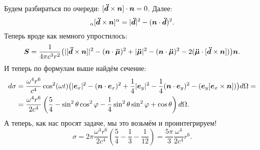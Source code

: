 Будем разбираться по очереди: $[\mbox{\boldmath $\ddot{d}$} \times \mbox{\boldmath $n$}] \cdot \mbox{\boldmath $n$} = 0$.
Далее:
\begin{equation*}
    [\vc{\ddot{d}} \times \vc{n}]_\alpha [\vc{\ddot{d}} \times \vc{n}]^\alpha = |\vc{\ddot{d}}|^2 - (\vc{n} \cdot \vc{\ddot{d}})^2.
\end{equation*}
Теперь вроде как немного упростилось:
\begin{equation*}
    \mbox{\boldmath $S$} = \frac{1}{4 \pi c^3 r^2} \big( |[\mbox{\boldmath $\ddot{d}$} \times \mbox{\boldmath $n$}]|^2 - (\mbox{\boldmath $n$} \cdot \mbox{\boldmath $\ddot{\mu}$})^2 + |\mbox{\boldmath $\ddot{\mu}$}|^2 - (\mbox{\boldmath $n$} \cdot \mbox{\boldmath $\ddot{\mu}$})^2 - 2 (\mbox{\boldmath $\ddot{\mu}$} \cdot [\mbox{\boldmath $\ddot{d}$} \times \mbox{\boldmath $n$}]) \big) \mbox{\boldmath $n$}.
\end{equation*}
И теперь по формулам выше найдём сечение:
\begin{align*}
    d \sigma &= \frac{\omega^4 r^6}{c^4} \cos^2 (\omega t)\big( |\mbox{\boldmath $e$}_x|^2 - (\mbox{\boldmath $n$} \cdot \mbox{\boldmath $e$}_x)^2 + \frac{1}{4}|\mbox{\boldmath $e$}_y|^2 - \frac{1}{4} (\mbox{\boldmath $n$} \cdot \mbox{\boldmath $e$}_y)^2 - (\mbox{\boldmath $e$}_y [\mbox{\boldmath $e$}_x \times \mbox{\boldmath $n$}])\big) d \Omega 
    = \\ &= 
    \frac{\omega^4 r^6}{2 c^4}
    \left( \frac{5}{4} - \sin^2 \theta \cos^2 \varphi - \frac{1}{4} \sin^2 \theta \sin^2 \varphi + \cos \theta\right) d \Omega.
\end{align*}
А теперь, как нас просят  задаче, мы это возьмём и проинтегрируем!
\begin{equation*}
    \sigma = 2 \pi \frac{\omega^4 r^6}{2 c^4} (\frac{5}{4} -\frac{1}{3} - \frac{1}{12}) =  \frac{5 \pi}{3} \frac{\omega^4}{2 c^4} r^6.
\end{equation*}
